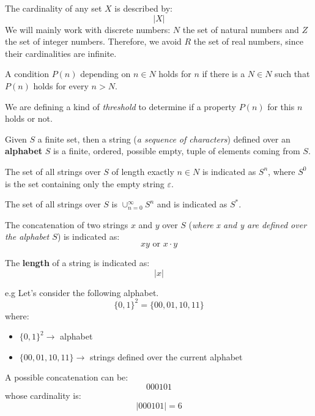 \begin{definition}
    The cardinality of any set $X$ is described by:
    $$|X|$$
    We will mainly work with discrete numbers: $N$ the set of natural numbers and $Z$ the set of integer numbers. Therefore, we avoid $R$ the set of real numbers,
    since their cardinalities are infinite.
\end{definition}
\begin{definition}
    A condition $P(n)$ depending on $n \in N$ holds for $n$ if there is a $N \in N$ such that $P(n)$ holds for every $n > N$. \vspace{7pt}

    We are defining a kind of \textit{threshold} to determine if a property $P(n)$ for this $n$ holds or not.
\end{definition}
\begin{definition}
    Given $S$ a finite set, then a string (\textit{a sequence of characters}) defined over an \textbf{alphabet} $S$ is a finite, ordered, possible empty, tuple
    of elements coming from $S$.
\end{definition}
\begin{definition}
    The set of all strings over $S$ of length exactly $n \in N$ is indicated as $S^n$, where $S^0$ is the set containing only the empty string $\varepsilon$.
\end{definition}
\begin{definition}
    The set of all strings over $S$ is $\cup_{n=0}^{\infty} S^n$ and is indicated as $S^*$.
\end{definition}
\begin{definition}
    The concatenation of two strings $x$ and $y$ over $S$ (\textit{where x and y are defined over the alphabet $S$}) is indicated as:
    $$xy \text{ or } x \cdot y$$
\end{definition}
\begin{definition}
    The \textbf{length} of a string is indicated as:
    $$|x|$$
\end{definition}
\begin{example}
    e.g Let's consider the following alphabet.
    $$\{0,1\}^2 = \{00, 01, 10, 11\}$$
    where:
    \begin{itemize}
        \renewcommand{\labelitemi}{-}
        \item $\{0,1\}^2 \rightarrow$ alphabet
        \item $\{00, 01, 10, 11\} \rightarrow$ strings defined over the current alphabet
    \end{itemize}

    A possible concatenation can be:
    $$000101$$
    whose cardinality is:
    $$|000101| = 6$$
\end{example}
